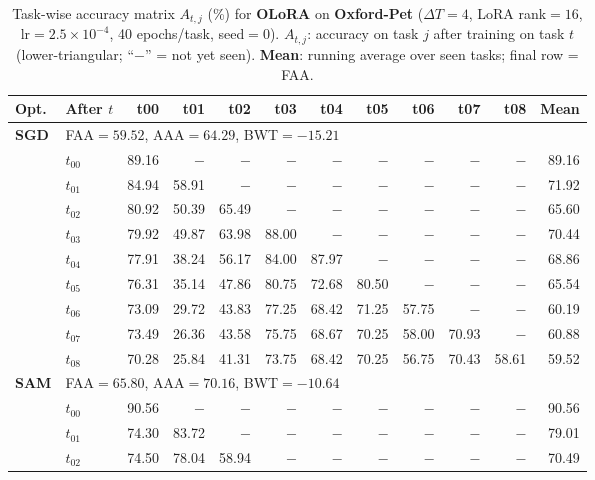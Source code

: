 \begin{table}[ht]
\centering
\caption{%
  Task-wise accuracy matrix $A_{t,j}$ (\%) for \textbf{OLoRA} on \textbf{Oxford-Pet} ($\Delta T=4$, LoRA rank$=16$, lr$=2.5\times10^{-4}$, 40 epochs/task, seed$=0$).
  $A_{t,j}$: accuracy on task $j$ after training on task $t$  (lower-triangular; ``$-$'' = not yet seen).
  \textbf{Mean}: running average over seen tasks; final row = FAA.
}
\label{tab:raw_olora_pets}
\setlength{\tabcolsep}{2.8pt}
\renewcommand{\arraystretch}{0.88}
\scriptsize
\begin{tabular}{@{}l l r r r r r r r r r r@{}}
\toprule
\textbf{Opt.} & \textbf{After $t$} & \textbf{t00} & \textbf{t01} & \textbf{t02} & \textbf{t03} & \textbf{t04} & \textbf{t05} & \textbf{t06} & \textbf{t07} & \textbf{t08} & \textbf{Mean} \\
\midrule
\multirow{10}{*}{\textbf{SGD}} & \multicolumn{11}{l}{\quad\small FAA$=59.52$,\; AAA$=64.29$,\; BWT$=-15.21$} \\
 & $t_{00}$ & 89.16 & $-$ & $-$ & $-$ & $-$ & $-$ & $-$ & $-$ & $-$ & 89.16 \\
 & $t_{01}$ & 84.94 & 58.91 & $-$ & $-$ & $-$ & $-$ & $-$ & $-$ & $-$ & 71.92 \\
 & $t_{02}$ & 80.92 & 50.39 & 65.49 & $-$ & $-$ & $-$ & $-$ & $-$ & $-$ & 65.60 \\
 & $t_{03}$ & 79.92 & 49.87 & 63.98 & 88.00 & $-$ & $-$ & $-$ & $-$ & $-$ & 70.44 \\
 & $t_{04}$ & 77.91 & 38.24 & 56.17 & 84.00 & 87.97 & $-$ & $-$ & $-$ & $-$ & 68.86 \\
 & $t_{05}$ & 76.31 & 35.14 & 47.86 & 80.75 & 72.68 & 80.50 & $-$ & $-$ & $-$ & 65.54 \\
 & $t_{06}$ & 73.09 & 29.72 & 43.83 & 77.25 & 68.42 & 71.25 & 57.75 & $-$ & $-$ & 60.19 \\
 & $t_{07}$ & 73.49 & 26.36 & 43.58 & 75.75 & 68.67 & 70.25 & 58.00 & 70.93 & $-$ & 60.88 \\
 & $t_{08}$ & 70.28 & 25.84 & 41.31 & 73.75 & 68.42 & 70.25 & 56.75 & 70.43 & 58.61 & 59.52 \\
\midrule
\multirow{10}{*}{\textbf{SAM}} & \multicolumn{11}{l}{\quad\small FAA$=65.80$,\; AAA$=70.16$,\; BWT$=-10.64$} \\
 & $t_{00}$ & 90.56 & $-$ & $-$ & $-$ & $-$ & $-$ & $-$ & $-$ & $-$ & 90.56 \\
 & $t_{01}$ & 74.30 & 83.72 & $-$ & $-$ & $-$ & $-$ & $-$ & $-$ & $-$ & 79.01 \\
 & $t_{02}$ & 74.50 & 78.04 & 58.94 & $-$ & $-$ & $-$ & $-$ & $-$ & $-$ & 70.49 \\

\end{tabular}
\end{table}
